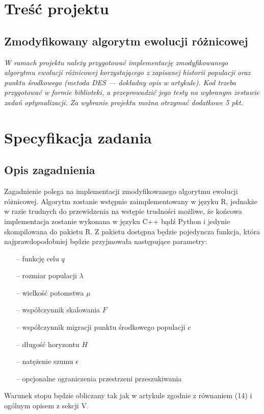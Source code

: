 \chapter{Treść projektu}
\section{Zmodyfikowany algorytm ewolucji różnicowej}
\textit{W ramach projektu należy przygotować implementację zmodyfikowanego algorytmu ewolucji różnicowej korzystającego z zapisanej historii populacji oraz punktu środkowego (metoda DES --- dokładny opis w artykule). Kod trzeba przygotować w formie biblioteki, a przeprowadzić jego testy na wybranym zestawie zadań optymalizacji. Za wybranie projektu można otrzymać dodatkowe 5 pkt.}

\chapter{Specyfikacja zadania}
\section{Opis zagadnienia}
Zagadnienie polega na implementacji zmodyfikowanego algorytmu ewolucji różnicowej. Algorytm zostanie wstępnie zaimplementowany w języku R, jednakże w razie trudnych do przewidzenia na wstępie trudności możliwe, że końcowa implementacja zostanie wykonana w języku C++ bądź Python i jedynie skompilowana do pakietu R. Z pakietu dostępna będzie pojedyncza funkcja, która najprawdopodobniej będzie przyjmowała następujące parametry:

\begin{itemize}
\item[--] funkcję celu $q$
\item[--] rozmiar populacji $\lambda$
\item[--] wielkość potomstwa $\mu$
\item[--] współczynnik skalowania $F$
\item[--] współczynnik migracji punktu środkowego populacji $c$
\item[--] długość horyzontu $H$
\item[--] natężenie szumu $\epsilon$
\item[--] opcjonalne ograniczenia przestrzeni przeszukiwania
\end{itemize}


Warunek stopu będzie obliczany tak jak w artykule zgodnie z równaniem (14) i ogólnym opisem z sekcji V.


